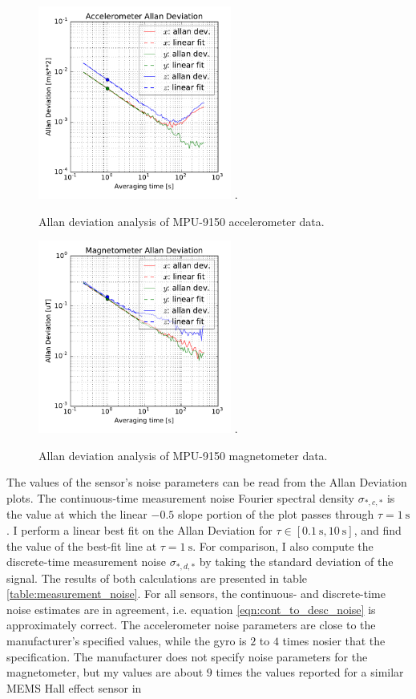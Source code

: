 \documentclass[conference]{IEEEtran}
\begin{document}
\begin{figure}[!t]
  \centering
  \includegraphics[width=2.5in]{figures/accel_data_allan.pdf}
  \DeclareGraphicsExtensions.
  \caption{Allan deviation analysis of MPU-9150 accelerometer data.}
  \label{accel_data_allan}
\end{figure}

\begin{figure}[!t]
  \centering
  \includegraphics[width=2.5in]{figures/mag_data_allan.pdf}
  \DeclareGraphicsExtensions.
  \caption{Allan deviation analysis of MPU-9150 magnetometer data.}
  \label{mag_data_allan}
\end{figure}

The values of the sensor's noise parameters can be read from the Allan Deviation plots. The continuous-time measurement noise Fourier spectral density $\sigma_{*,c,*}$ is the value at which the linear $-0.5$ slope portion of the plot passes through $\tau = \SI{1}{\second}$ \cite{UCAM-CL-TR-696}. I perform a linear best fit on the Allan Deviation for $\tau \in [\SI{0.1}{\second}, \SI{10}{\second}]$, and find the value of the best-fit line at $\tau = \SI{1}{\second}$. For comparison, I also compute the discrete-time measurement noise $\sigma_{*,d,*}$ by taking the standard deviation of the signal. The results of both calculations are presented in table \ref{table:measurement_noise}. For all sensors, the continuous- and discrete-time noise estimates are in agreement, i.e. equation \ref{eqn:cont_to_desc_noise} is approximately correct. The accelerometer noise parameters are close to the manufacturer's specified values, while the gyro is $2$ to $4$ times nosier that the specification. The manufacturer does not specify noise parameters for the magnetometer, but my values are about $9$ times the values reported for a similar MEMS Hall effect sensor in \cite{1643403}\\
\end{document}
